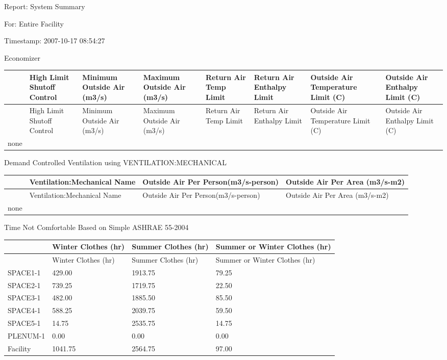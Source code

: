 Report: System Summary

For: Entire Facility

Timestamp: 2007-10-17 08:54:27

Economizer

\begin{longtable}[c]{>{\raggedright}p{0.75in}>{\raggedright}p{0.75in}>{\raggedright}p{0.75in}>{\raggedright}p{0.75in}>{\raggedright}p{0.75in}>{\raggedright}p{0.75in}>{\raggedright}p{0.75in}>{\raggedright}p{0.75in}}
\toprule
~ & High Limit Shutoff Control & Minimum Outside Air (m3/s) & Maximum Outside Air (m3/s) & Return Air Temp Limit & Return Air Enthalpy Limit & Outside Air Temperature Limit (C) & Outside Air Enthalpy Limit (C) \tabularnewline
\midrule
\endfirsthead

\toprule
~ & High Limit Shutoff Control & Minimum Outside Air (m3/s) & Maximum Outside Air (m3/s) & Return Air Temp Limit & Return Air Enthalpy Limit & Outside Air Temperature Limit (C) & Outside Air Enthalpy Limit (C) \tabularnewline
\midrule
\endhead

none & ~ & ~ & ~ & ~ & ~ & ~ & ~ \tabularnewline
\bottomrule
\end{longtable}

Demand Controlled Ventilation using VENTILATION:MECHANICAL

\begin{longtable}[c]{>{\raggedright}p{1.5in}>{\raggedright}p{1.5in}>{\raggedright}p{1.5in}>{\raggedright}p{1.5in}}
\toprule
~ & Ventilation:Mechanical Name & Outside Air Per Person(m3/s-person) & Outside Air Per Area (m3/s-m2) \tabularnewline
\midrule
\endfirsthead

\toprule
~ & Ventilation:Mechanical Name & Outside Air Per Person(m3/s-person) & Outside Air Per Area (m3/s-m2) \tabularnewline
\midrule
\endhead

none & ~ & ~ & ~ \tabularnewline
\bottomrule
\end{longtable}

Time Not Comfortable Based on Simple ASHRAE 55-2004

\begin{longtable}[c]{>{\raggedright}p{1.5in}>{\raggedright}p{1.5in}>{\raggedright}p{1.5in}>{\raggedright}p{1.5in}}
\toprule
~ & Winter Clothes (hr) & Summer Clothes (hr) & Summer or Winter Clothes (hr) \tabularnewline
\midrule
\endfirsthead

\toprule
~ & Winter Clothes (hr) & Summer Clothes (hr) & Summer or Winter Clothes (hr) \tabularnewline
\midrule
\endhead

SPACE1-1 & 429.00 & 1913.75 & 79.25 \tabularnewline
SPACE2-1 & 739.25 & 1719.75 & 22.50 \tabularnewline
SPACE3-1 & 482.00 & 1885.50 & 85.50 \tabularnewline
SPACE4-1 & 588.25 & 2039.75 & 59.50 \tabularnewline
SPACE5-1 & 14.75 & 2535.75 & 14.75 \tabularnewline
PLENUM-1 & 0.00 & 0.00 & 0.00 \tabularnewline
Facility & 1041.75 & 2564.75 & 97.00 \tabularnewline
\bottomrule
\end{longtable}

